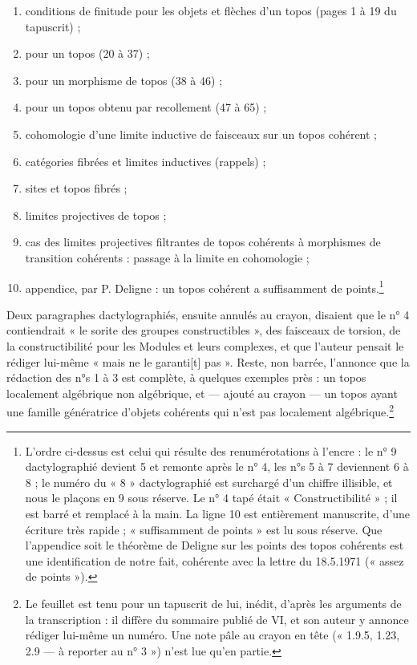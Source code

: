 \documentclass[11pt,a4paper]{article}
\begin{document}
\begin{enumerate}
\item conditions de finitude pour les objets et flèches d'un topos (pages 1
à 19 du tapuscrit) ;
\item pour un topos (20 à 37) ;
\item pour un morphisme de topos (38 à 46) ;
\item pour un topos obtenu par recollement (47 à 65) ;
\item cohomologie d'une limite inductive de faisceaux sur un topos cohérent ;
\item catégories fibrées et limites inductives (rappels) ;
\item sites et topos fibrés ;
\item limites projectives de topos ;
\item cas des limites projectives filtrantes de topos cohérents à morphismes
de transition cohérents : passage à la limite en cohomologie ;
\item appendice, par P. Deligne : un topos cohérent a suffisamment de
points.\footnote{L'ordre ci-dessus est celui qui résulte des renumérotations
à l'encre : le n° 9 dactylographié devient 5 et remonte après le n° 4, les
n°s 5 à 7 deviennent 6 à 8 ; le numéro du « 8 » dactylographié est surchargé
d'un chiffre illisible, et nous le plaçons en 9 sous réserve. Le n° 4 tapé
était « Constructibilité » ; il est barré et remplacé à la main. La ligne 10
est entièrement manuscrite, d'une écriture très rapide ; « suffisamment de
points » est lu sous réserve. Que l'appendice soit le théorème de Deligne sur
les points des topos cohérents est une identification de notre fait,
cohérente avec la lettre du 18.5.1971 (« assez de points »).}
\end{enumerate}

Deux paragraphes dactylographiés, ensuite annulés au crayon, disaient que le
n° 4 contiendrait « le sorite des groupes constructibles », des faisceaux de
torsion, de la constructibilité pour les Modules et leurs complexes, et que
l'auteur pensait le rédiger lui-même « mais ne le garanti[t] pas ». Reste,
non barrée, l'annonce que la rédaction des n°s 1 à 3 est complète, à quelques
exemples près : un topos localement algébrique non algébrique, et --- ajouté
au crayon --- un topos ayant une famille génératrice d'objets cohérents qui
n'est pas localement algébrique.\footnote{Le feuillet est tenu pour un
tapuscrit de lui, inédit, d'après les arguments de la transcription : il
diffère du sommaire publié de VI, et son auteur y annonce rédiger lui-même un
numéro. Une note pâle au crayon en tête (« 1.9.5, 1.23, 2.9 --- à reporter au
n° 3 ») n'est lue qu'en partie.}
\end{document}
